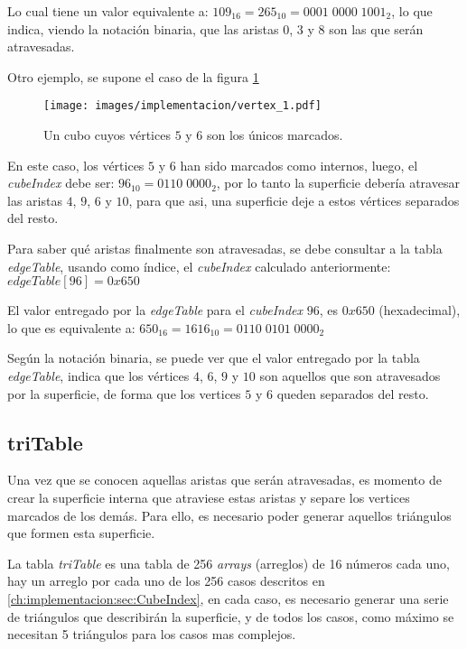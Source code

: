 Lo cual tiene un valor equivalente a: $109_{16} = 265_{10} = 0001 \; 0000 \; 1001_{2}$, lo que indica, viendo la notación binaria, que las aristas $0$, $3$ y $8$ son las que serán atravesadas.

Otro ejemplo, se supone el caso de la figura \ref{f:ch:implementacion:sec:CubeIndex:edgeTable:vertex_1}

\begin{figure}[hbt]
	\centering
	\fbox
	{
		\texttt{[image: images/implementacion/vertex\_1.pdf]}
	}
	\caption{Un cubo cuyos vértices $5$ y $6$ son los únicos marcados.}
	\label{f:ch:implementacion:sec:CubeIndex:edgeTable:vertex_1}
\end{figure}

En este caso, los vértices $5$ y $6$ han sido marcados como internos, luego, el \emph{cubeIndex} debe ser: $96_{10} = 0110 \; 0000_{2}$, por lo tanto la superficie debería atravesar las aristas $4$, $9$, $6$ y $10$, para que asi, una superficie deje a estos vértices separados del resto.

Para saber qué aristas finalmente son atravesadas, se debe consultar a la tabla \emph{edgeTable}, usando como índice, el \emph{cubeIndex} calculado anteriormente: $edgeTable[96] = 0x650$

El valor entregado por la \emph{edgeTable} para el \emph{cubeIndex} $96$, es $0x650$ (hexadecimal), lo que es equivalente a: $650_{16} = 1616_{10} = 0110 \; 0101 \; 0000_{2}$

Según la notación binaria, se puede ver que el valor entregado por la tabla \emph{edgeTable}, indica que los vértices $4$, $6$, $9$ y $10$ son aquellos que son atravesados por la superficie, de forma que los vertices $5$ y $6$ queden separados del resto.

\subsection{triTable}
\label{ch:implementacion:sec:triTable}

Una vez que se conocen aquellas aristas que serán atravesadas, es momento de crear la superficie interna que atraviese estas aristas y separe los vertices marcados de los demás. Para ello, es necesario poder generar aquellos triángulos que formen esta superficie.

La tabla \emph{triTable} es una tabla de 256 \emph{arrays} (arreglos) de 16 números cada uno, hay un arreglo por cada uno de los 256 casos descritos en \ref{ch:implementacion:sec:CubeIndex}, en cada caso, es necesario generar una serie de triángulos que describirán la superficie, y de todos los casos, como máximo se necesitan 5 triángulos para los casos mas complejos.

